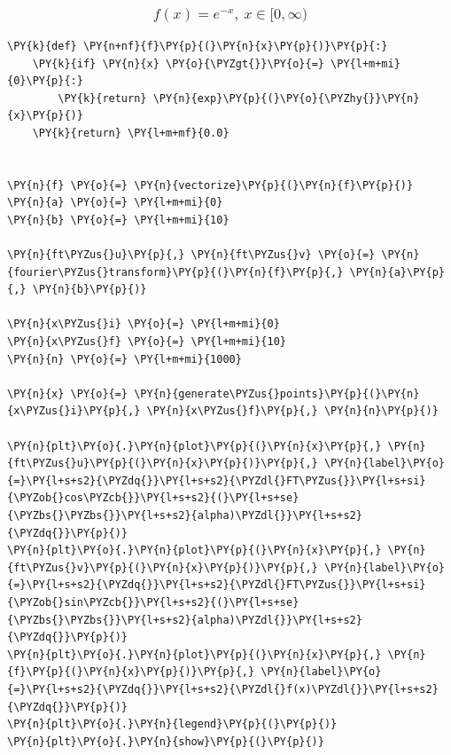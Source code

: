     \begin{center}
    \end{center}
    { \hspace*{\fill} \\}
    
    \hypertarget{fx-e-x-x-in-0-infty}{%
\subsubsection{\texorpdfstring{\[f(x) = e^{-x}, \ x \in [0, \infty)\]}{f(x) = e\^{}\{-x\}, \textbackslash{} x \textbackslash in {[}0, \textbackslash infty)}}\label{fx-e-x-x-in-0-infty}}

    \begin{tcolorbox}[breakable, size=fbox, boxrule=1pt, pad at break*=1mm,colback=cellbackground, colframe=cellborder]
\begin{Verbatim}[commandchars=\\\{\}]
\PY{k}{def} \PY{n+nf}{f}\PY{p}{(}\PY{n}{x}\PY{p}{)}\PY{p}{:}
    \PY{k}{if} \PY{n}{x} \PY{o}{\PYZgt{}}\PY{o}{=} \PY{l+m+mi}{0}\PY{p}{:}
        \PY{k}{return} \PY{n}{exp}\PY{p}{(}\PY{o}{\PYZhy{}}\PY{n}{x}\PY{p}{)}
    \PY{k}{return} \PY{l+m+mf}{0.0}


\PY{n}{f} \PY{o}{=} \PY{n}{vectorize}\PY{p}{(}\PY{n}{f}\PY{p}{)}
\PY{n}{a} \PY{o}{=} \PY{l+m+mi}{0}
\PY{n}{b} \PY{o}{=} \PY{l+m+mi}{10}

\PY{n}{ft\PYZus{}u}\PY{p}{,} \PY{n}{ft\PYZus{}v} \PY{o}{=} \PY{n}{fourier\PYZus{}transform}\PY{p}{(}\PY{n}{f}\PY{p}{,} \PY{n}{a}\PY{p}{,} \PY{n}{b}\PY{p}{)}

\PY{n}{x\PYZus{}i} \PY{o}{=} \PY{l+m+mi}{0}
\PY{n}{x\PYZus{}f} \PY{o}{=} \PY{l+m+mi}{10}
\PY{n}{n} \PY{o}{=} \PY{l+m+mi}{1000}

\PY{n}{x} \PY{o}{=} \PY{n}{generate\PYZus{}points}\PY{p}{(}\PY{n}{x\PYZus{}i}\PY{p}{,} \PY{n}{x\PYZus{}f}\PY{p}{,} \PY{n}{n}\PY{p}{)}

\PY{n}{plt}\PY{o}{.}\PY{n}{plot}\PY{p}{(}\PY{n}{x}\PY{p}{,} \PY{n}{ft\PYZus{}u}\PY{p}{(}\PY{n}{x}\PY{p}{)}\PY{p}{,} \PY{n}{label}\PY{o}{=}\PY{l+s+s2}{\PYZdq{}}\PY{l+s+s2}{\PYZdl{}FT\PYZus{}}\PY{l+s+si}{\PYZob{}cos\PYZcb{}}\PY{l+s+s2}{(}\PY{l+s+se}{\PYZbs{}\PYZbs{}}\PY{l+s+s2}{alpha)\PYZdl{}}\PY{l+s+s2}{\PYZdq{}}\PY{p}{)}
\PY{n}{plt}\PY{o}{.}\PY{n}{plot}\PY{p}{(}\PY{n}{x}\PY{p}{,} \PY{n}{ft\PYZus{}v}\PY{p}{(}\PY{n}{x}\PY{p}{)}\PY{p}{,} \PY{n}{label}\PY{o}{=}\PY{l+s+s2}{\PYZdq{}}\PY{l+s+s2}{\PYZdl{}FT\PYZus{}}\PY{l+s+si}{\PYZob{}sin\PYZcb{}}\PY{l+s+s2}{(}\PY{l+s+se}{\PYZbs{}\PYZbs{}}\PY{l+s+s2}{alpha)\PYZdl{}}\PY{l+s+s2}{\PYZdq{}}\PY{p}{)}
\PY{n}{plt}\PY{o}{.}\PY{n}{plot}\PY{p}{(}\PY{n}{x}\PY{p}{,} \PY{n}{f}\PY{p}{(}\PY{n}{x}\PY{p}{)}\PY{p}{,} \PY{n}{label}\PY{o}{=}\PY{l+s+s2}{\PYZdq{}}\PY{l+s+s2}{\PYZdl{}f(x)\PYZdl{}}\PY{l+s+s2}{\PYZdq{}}\PY{p}{)}
\PY{n}{plt}\PY{o}{.}\PY{n}{legend}\PY{p}{(}\PY{p}{)}
\PY{n}{plt}\PY{o}{.}\PY{n}{show}\PY{p}{(}\PY{p}{)}
\end{Verbatim}
\end{tcolorbox}

